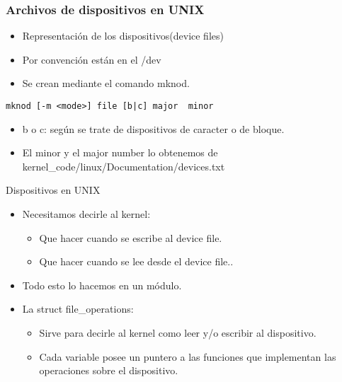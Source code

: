 \begin{frame}[fragile]
\frametitle{Archivos de dispositivos en UNIX}  
  \begin{itemize}
	\item Representación de los dispositivos(device files)
	\item Por convención están en el /dev
	\item Se crean mediante el comando mknod.
  \end{itemize}
\begin{lstlisting}
mknod [-m <mode>] file [b|c] major  minor
\end{lstlisting}
  \begin{itemize}
	\item b o c: según se trate de dispositivos de caracter o de bloque.
	\item El minor y el major number lo obtenemos de kernel\_code/linux/Documentation/devices.txt
  \end{itemize}
\end{frame}

\begin{frame}{Dispositivos en UNIX}
  \begin{itemize}
  \item Necesitamos decirle al kernel: 
  \begin{itemize}
    \item Que hacer cuando se escribe al device file.
    \item Que hacer cuando se lee desde el device file..
  \end{itemize} 
 \item Todo esto lo hacemos en un módulo.
 \item La struct \alert{file\_operations}: 
  \begin{itemize}
    \item Sirve para decirle al kernel como leer y/o escribir al dispositivo.
    \item Cada variable posee un puntero a las funciones que implementan las operaciones sobre el dispositivo.
  \end{itemize}   

  \end{itemize}
\end{frame}

